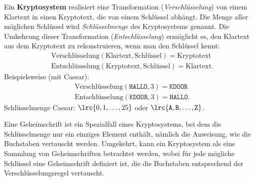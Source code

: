 \begin{frame}\leavevmode
{\small
\begin{mydefinition}[Kryptosystem]\label{mydefinition:kryptosystem}
    Ein \textbf{Kryptosystem} realisiert eine Transformation (\emph{Verschlüsselung}) von einem Klartext in einen Kryptotext, die von einem Schlüssel abhängt. 
    Die Menge aller möglichen Schlüssel wird \emph{Schlüsselmenge} des Kryptosystems genannt.
    Die Umkehrung dieser Transformation (\emph{Entschlüsselung}) ermöglicht es, den Klartext aus dem Kryptotext zu rekonstruieren, wenn man den Schlüssel kennt:
    \begin{align*}
        &\text{Verschlüsselung}(\text{Klartext}, \text{Schlüssel}) = \text{Kryptotext} \\
        &\text{Entschlüsselung}(\text{Kryptotext}, \text{Schlüssel}) = \text{Klartext}.
    \end{align*}
    Beispielsweise (mit Caesar):
    \begin{align*}
        &\text{Verschlüsselung}(\texttt{HALLO}, 3) = \texttt{KDOOR} \\
        &\text{Entschlüsselung}(\texttt{KDOOR}, 3) = \texttt{HALLO}.
    \end{align*}
    Schlüsselmenge Caesar: $\lrc{0, 1, \dots, 25}$ oder $\lrc{\texttt{A}, \texttt{B}, \dots, \texttt{Z}}$.	
\end{mydefinition}
}
\end{frame}

\begin{frame}
    \begin{myremark}
        Eine Geheimschrift ist ein Spezialfall eines Kryptosystems, bei dem die Schlüsselmenge nur ein einziges Element enthält, nämlich die Anweisung, wie die Buchstaben vertauscht werden. 
        Umgekehrt, kann ein Kryptosystem als eine Sammlung von Geheimschriften betrachtet werden, wobei für jede mögliche Schlüssel eine Geheimschrift definiert ist, die die Buchstaben entsprechend der Verschlüsselungsregel vertauscht.
    \end{myremark}
\end{frame}